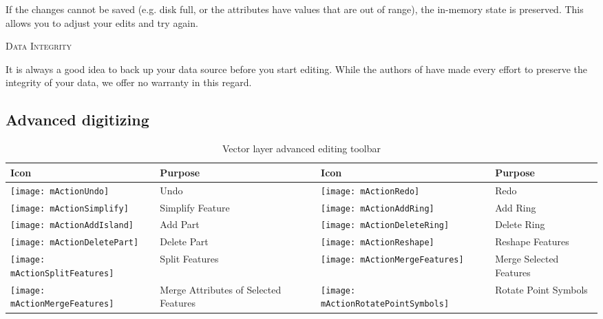 If the changes cannot be saved (e.g. disk full, or the attributes have
values that are out of range), the \qg in-memory state is preserved.  This
allows you to adjust your edits and try again.

\begin{Tip}\caption{\textsc{Data Integrity}}
It is always a good idea to back up your data source before you
start editing. While the authors of \qg have made every effort to preserve the
integrity of your data, we offer no warranty in this regard.
\end{Tip}

\subsection{Advanced digitizing}
\label{sec:advanced_edit}

\begin{table}[h]
\centering
\small
\begin{tabular}{|l|p{6.9cm}|l|p{6.9cm}|}
\hline \textbf{Icon} & \textbf{Purpose} & \textbf{Icon} & \textbf{Purpose} \\
\hline \texttt{[image: mActionUndo]}
   & Undo
   & \texttt{[image: mActionRedo]}
   & Redo \\
\hline \texttt{[image: mActionSimplify]}
   & Simplify Feature
   & \texttt{[image: mActionAddRing]}
   & Add Ring \\
\hline \texttt{[image: mActionAddIsland]}
   & Add Part
   & \texttt{[image: mActionDeleteRing]}
   & Delete Ring \\
\hline \texttt{[image: mActionDeletePart]}
   & Delete Part
   & \texttt{[image: mActionReshape]}
   & Reshape Features \\
\hline \texttt{[image: mActionSplitFeatures]}
   & Split Features
   & \texttt{[image: mActionMergeFeatures]}
   & Merge Selected Features \\
\hline \texttt{[image: mActionMergeFeatures]}
   & Merge Attributes of Selected Features
   &\texttt{[image: mActionRotatePointSymbols]}
   & Rotate Point Symbols \\
\hline
\end{tabular}
\caption{Vector layer advanced editing toolbar}\label{tab:advanced_editing}
\end{table}

